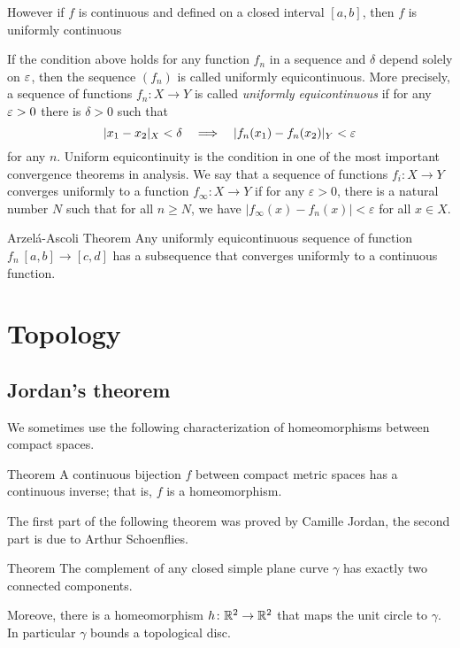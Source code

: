 However if $f$ is continuous and defined on a closed interval $[a,b]$, then $f$ is uniformly continuous

If the condition above holds for any function $f_n$ in a sequence and $\delta$ depend solely on $\varepsilon$,
then the sequence $(f_n)$ is called uniformly equicontinuous.
More precisely, 
a sequence of functions $f_n:X\to Y$ is called \emph{uniformly equicontinuous} if 
for any $\varepsilon>0$ there is $\delta>0$ such that 
\[|x_1-x_2|_X<\delta\quad\Longrightarrow\quad |f_n(x_1)-f_n(x_2)|_Y<\varepsilon\]
for any $n$.
Uniform equicontinuity is the condition in one of the most important convergence theorems in analysis. 
We say that a sequence of functions $f_i : X \to Y$ converges uniformly to a function $f_{\infty}: X \to Y$ if for any 
$\varepsilon >0$, there is a natural number $N$ such that for all $n \geq N$, we have $| f_{\infty} (x)- f_n (x) | < \varepsilon$
for all $x  \in X$.

\begin{thm}{Arzel\'{a}-Ascoli Theorem}\label{lem:equicontinuous}
Any uniformly equicontinuous sequence of function $f_n\:[a,b]\to [c,d]$ has a subsequence that converges uniformly to a continuous function. 
\end{thm}

\chapter{Topology}

\section{Jordan's theorem}

We sometimes use the following characterization of homeomorphisms between compact spaces.

\begin{thm}{Theorem}\label{thm:Hausdorff-compact}
A continuous bijection $f$ between compact metric spaces has a continuous inverse;
that is, $f$ is a homeomorphism.
\end{thm}


The first part of the following theorem was proved by Camille Jordan, the second part is due to Arthur Schoenflies.

\begin{thm}{Theorem}\label{thm:jordan}
The complement of any closed simple plane curve $\gamma$ has exactly two connected components. 

Moreove, there is a homeomorphism $h\colon\mathbb{R}^2\to \mathbb{R}^2$ that maps the unit circle to $\gamma$.
In particular $\gamma$ bounds a topological disc.
\end{thm}


